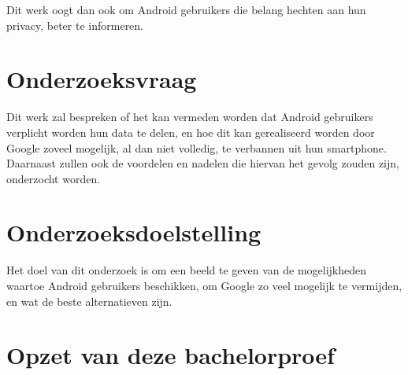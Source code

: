 Dit werk oogt dan ook om Android gebruikers die belang hechten aan hun privacy, beter te informeren.


\section{Onderzoeksvraag}
\label{sec:onderzoeksvraag}

Dit werk zal bespreken of het kan vermeden worden dat Android gebruikers verplicht worden hun data te delen, en hoe dit kan gerealiseerd worden door Google zoveel mogelijk, al dan niet volledig, te verbannen uit hun smartphone. Daarnaast zullen ook de voordelen en nadelen die hiervan het gevolg zouden zijn, onderzocht worden.

\section{Onderzoeksdoelstelling}
\label{sec:onderzoeksdoelstelling}

Het doel van dit onderzoek is om een beeld te geven van de mogelijkheden waartoe Android gebruikers beschikken, om Google zo veel mogelijk te vermijden, en wat de beste alternatieven zijn.

\section{Opzet van deze bachelorproef}
\label{sec:opzet-bachelorproef}

